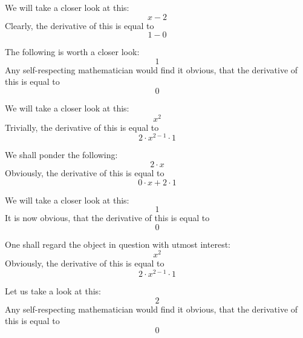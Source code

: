 \documentclass{article}
\begin{document}
We will take a closer look at this:
\begin{equation}
x - 2 
\end{equation}
Clearly, the derivative of this is equal to
\begin{equation}
1 - 0 
\end{equation}

The following is worth a closer look:
\begin{equation}
1 
\end{equation}
Any self-respecting mathematician would find it obvious, that the derivative of this is equal to
\begin{equation}
0 
\end{equation}

We will take a closer look at this:
\begin{equation}
x ^{2 } 
\end{equation}
Trivially, the derivative of this is equal to
\begin{equation}
2 \cdot x ^{2 - 1 } \cdot 1 
\end{equation}

We shall ponder the following:
\begin{equation}
2 \cdot x 
\end{equation}
Obviously, the derivative of this is equal to
\begin{equation}
0 \cdot x + 2 \cdot 1 
\end{equation}

We will take a closer look at this:
\begin{equation}
1 
\end{equation}
It is now obvious, that the derivative of this is equal to
\begin{equation}
0 
\end{equation}

One shall regard the object in question with utmost interest:
\begin{equation}
x ^{2 } 
\end{equation}
Obviously, the derivative of this is equal to
\begin{equation}
2 \cdot x ^{2 - 1 } \cdot 1 
\end{equation}

Let us take a look at this:
\begin{equation}
2 
\end{equation}
Any self-respecting mathematician would find it obvious, that the derivative of this is equal to
\begin{equation}
0 
\end{equation}
\end{document}
